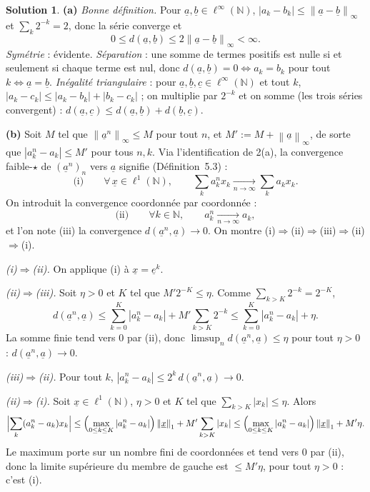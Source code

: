 \documentclass[11pt,a4paper]{article}
\newcommand{\N}{\mathbb{N}}
\newcommand{\norm}[1]{\left\|#1\right\|}
\theoremstyle{definition}
\newtheorem*{solution}{Solution}
\newcommand{\su}[1]{\underline{#1}}
\newcommand{\linf}{\ell^\infty(\N)}
\newcommand{\lun}{\ell^1(\N)}
\begin{document}
\begin{solution}
\noindent\textbf{(a)} \emph{Bonne définition.} Pour $\su a,\su b\in\linf$, $|a_k-b_k|\le\norm{\su a-\su b}_\infty$ et $\sum_k2^{-k}=2$, donc la série converge et
\begin{equation}\label{eq:dnorm}
  0\le d(\su a,\su b)\le2\norm{\su a-\su b}_\infty<\infty .
\end{equation}
\emph{Symétrie} : évidente. \emph{Séparation} : une somme de termes positifs est nulle si et seulement si chaque terme est nul, donc $d(\su a,\su b)=0\iff a_k=b_k$ pour tout $k\iff\su a=\su b$. \emph{Inégalité triangulaire} : pour $\su a,\su b,\su c\in\linf$ et tout $k$, $|a_k-c_k|\le|a_k-b_k|+|b_k-c_k|$ ; on multiplie par $2^{-k}$ et on somme (les trois séries convergent) : $d(\su a,\su c)\le d(\su a,\su b)+d(\su b,\su c)$.

\medskip
\noindent\textbf{(b)} Soit $M$ tel que $\norm{\su a^n}_\infty\le M$ pour tout $n$, et $M':=M+\norm{\su a}_\infty$, de sorte que $|a^n_k-a_k|\le M'$ pour tous $n,k$. Via l'identification de 2(a), la convergence faible-$\star$ de $(\su a^n)_n$ vers $\su a$ signifie (Définition~5.3) :
\[
  \text{(i)}\qquad\forall\,\su x\in\lun,\qquad\sum_ka^n_kx_k\xrightarrow[n\to\infty]{}\sum_ka_kx_k .
\]
On introduit la convergence coordonnée par coordonnée :
\[
  \text{(ii)}\qquad\forall k\in\N,\qquad a^n_k\xrightarrow[n\to\infty]{}a_k,
\]
et l'on note (iii) la convergence $d(\su a^n,\su a)\to0$. On montre (i)$\Rightarrow$(ii)$\Rightarrow$(iii)$\Rightarrow$(ii)$\Rightarrow$(i).

\emph{(i)$\Rightarrow$(ii).} On applique (i) à $\su x=\su e^k$.

\emph{(ii)$\Rightarrow$(iii).} Soit $\eta>0$ et $K$ tel que $M'2^{-K}\le\eta$. Comme $\sum_{k>K}2^{-k}=2^{-K}$,
\[
  d(\su a^n,\su a)\le\sum_{k=0}^K|a^n_k-a_k|+M'\sum_{k>K}2^{-k}\le\sum_{k=0}^K|a^n_k-a_k|+\eta .
\]
La somme finie tend vers $0$ par (ii), donc $\limsup_nd(\su a^n,\su a)\le\eta$ pour tout $\eta>0$ : $d(\su a^n,\su a)\to0$.

\emph{(iii)$\Rightarrow$(ii).} Pour tout $k$, $|a^n_k-a_k|\le2^k\,d(\su a^n,\su a)\to0$.

\emph{(ii)$\Rightarrow$(i).} Soit $\su x\in\lun$, $\eta>0$ et $K$ tel que $\sum_{k>K}|x_k|\le\eta$. Alors
\[
  \Bigl|\sum_k(a^n_k-a_k)x_k\Bigr|\le\Bigl(\max_{0\le k\le K}|a^n_k-a_k|\Bigr)\norm{\su x}_1+M'\sum_{k>K}|x_k|\le\Bigl(\max_{0\le k\le K}|a^n_k-a_k|\Bigr)\norm{\su x}_1+M'\eta .
\]
Le maximum porte sur un nombre fini de coordonnées et tend vers $0$ par (ii), donc la limite supérieure du membre de gauche est $\le M'\eta$, pour tout $\eta>0$ : c'est (i).


\end{solution}
\end{document}
